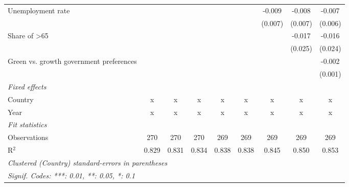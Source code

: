 \begin{table}[htbp]
\begin{tabular}{lcccccccc}
      Unemployment rate                             &         &         &         &         &         & -0.009      & -0.008      & -0.007\\   
                                                    &         &         &         &         &         & (0.007)     & (0.007)     & (0.006)\\   
      Share of >65                                  &         &         &         &         &         &             & -0.017      & -0.016\\   
                                                    &         &         &         &         &         &             & (0.025)     & (0.024)\\   
      Green vs. growth government preferences       &         &         &         &         &         &             &             & -0.002\\   
                                                    &         &         &         &         &         &             &             & (0.001)\\   
      \emph{Fixed effects}\\
      Country                                       & x       & x       & x       & x       & x       & x           & x           & x\\  
      Year                                          & x       & x       & x       & x       & x       & x           & x           & x\\  
      \midrule \emph{Fit statistics}\\
      Observations                                  & 270     & 270     & 270     & 269     & 269     & 269         & 269         & 269\\  
      R$^2$                                         & 0.829   & 0.831   & 0.834   & 0.838   & 0.838   & 0.845       & 0.850       & 0.853\\  
      \midrule
      \multicolumn{9}{l}{\emph{Clustered (Country) standard-errors in parentheses}}\\
      \multicolumn{9}{l}{\emph{Signif. Codes: ***: 0.01, **: 0.05, *: 0.1}}\\
   \end{tabular}
\end{table}


